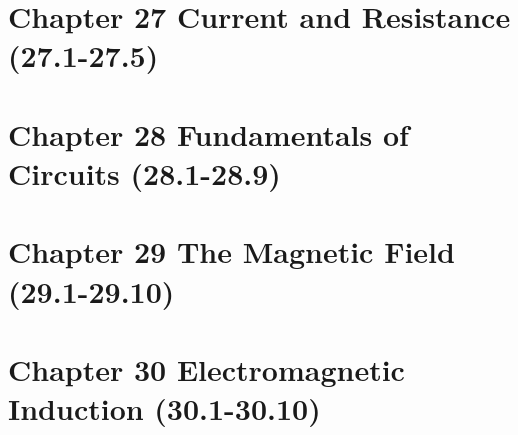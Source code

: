 \documentclass{article}
\begin{document}



\LARGE

\section*{Chapter 27 Current and Resistance (27.1-27.5)}






\LARGE

\section*{Chapter 28 Fundamentals of Circuits (28.1-28.9)}






\LARGE

\section*{Chapter 29 The Magnetic Field (29.1-29.10)}






\LARGE

\section*{Chapter 30 Electromagnetic Induction (30.1-30.10)}



\normalsize
\end{document}
